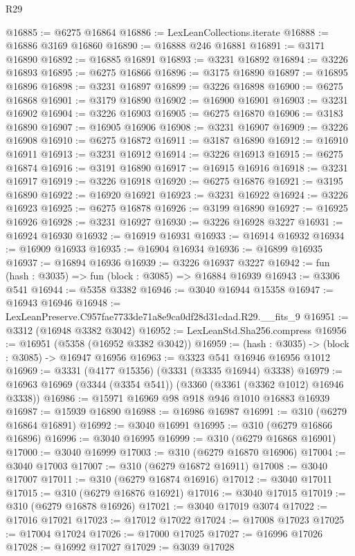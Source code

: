 \begin{lexlean}{R29}
\begin{coremodule}
@16885 := @6275 @16864
@16886 := LexLeanCollections.iterate
@16888 := @16886 @3169 @16860
@16890 := @16888 @246 @16881
@16891 := @3171 @16890
@16892 := @16885 @16891
@16893 := @3231 @16892
@16894 := @3226 @16893
@16895 := @6275 @16866
@16896 := @3175 @16890
@16897 := @16895 @16896
@16898 := @3231 @16897
@16899 := @3226 @16898
@16900 := @6275 @16868
@16901 := @3179 @16890
@16902 := @16900 @16901
@16903 := @3231 @16902
@16904 := @3226 @16903
@16905 := @6275 @16870
@16906 := @3183 @16890
@16907 := @16905 @16906
@16908 := @3231 @16907
@16909 := @3226 @16908
@16910 := @6275 @16872
@16911 := @3187 @16890
@16912 := @16910 @16911
@16913 := @3231 @16912
@16914 := @3226 @16913
@16915 := @6275 @16874
@16916 := @3191 @16890
@16917 := @16915 @16916
@16918 := @3231 @16917
@16919 := @3226 @16918
@16920 := @6275 @16876
@16921 := @3195 @16890
@16922 := @16920 @16921
@16923 := @3231 @16922
@16924 := @3226 @16923
@16925 := @6275 @16878
@16926 := @3199 @16890
@16927 := @16925 @16926
@16928 := @3231 @16927
@16930 := @3226 @16928 @3227
@16931 := @16924 @16930
@16932 := @16919 @16931
@16933 := @16914 @16932
@16934 := @16909 @16933
@16935 := @16904 @16934
@16936 := @16899 @16935
@16937 := @16894 @16936
@16939 := @3226 @16937 @3227
@16942 := fun (hash : @3035) => fun (block : @3085) => @16884 @16939
@16943 := @3306 @541
@16944 := @5358 @3382
@16946 := @3040 @16944 @15358
@16947 := @16943 @16946
@16948 := LexLeanPreserve.C957fae7733de71a8e9ca0df28d31cdad.R29.__fits_9
@16951 := @3312 (@16948 @3382 @3042)
@16952 := LexLeanStd.Sha256.compress
@16956 := @16951 (@5358 (@16952 @3382 @3042))
@16959 := (hash : @3035) -> (block : @3085) -> @16947 @16956
@16963 := @3323 @541 @16946 @16956 @1012
@16969 := @3331 (@4177 @15356) (@3331 (@3335 @16944) @3338)
@16979 := @16963 @16969 (@3344 (@3354 @541)) (@3360 (@3361 (@3362 @1012) @16946 @3338))
@16986 := @15971 @16969 @98 @918 @946 @1010 @16883 @16939
@16987 := @15939 @16890
@16988 := @16986 @16987
@16991 := @310 (@6279 @16864 @16891)
@16992 := @3040 @16991
@16995 := @310 (@6279 @16866 @16896)
@16996 := @3040 @16995
@16999 := @310 (@6279 @16868 @16901)
@17000 := @3040 @16999
@17003 := @310 (@6279 @16870 @16906)
@17004 := @3040 @17003
@17007 := @310 (@6279 @16872 @16911)
@17008 := @3040 @17007
@17011 := @310 (@6279 @16874 @16916)
@17012 := @3040 @17011
@17015 := @310 (@6279 @16876 @16921)
@17016 := @3040 @17015
@17019 := @310 (@6279 @16878 @16926)
@17021 := @3040 @17019 @3074
@17022 := @17016 @17021
@17023 := @17012 @17022
@17024 := @17008 @17023
@17025 := @17004 @17024
@17026 := @17000 @17025
@17027 := @16996 @17026
@17028 := @16992 @17027
@17029 := @3039 @17028

\end{coremodule}
\end{lexlean}
